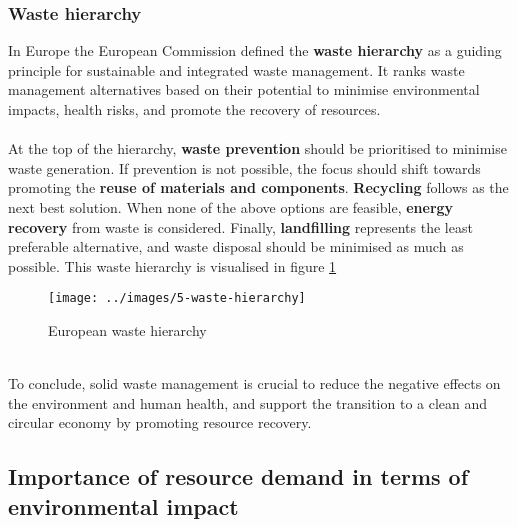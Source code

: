 \documentclass[../summary.tex]{subfiles}
\begin{document}
\subsubsection{Waste hierarchy}

In Europe the European Commission defined the \textbf{waste hierarchy} as a guiding principle for sustainable and integrated waste management. It ranks waste management alternatives based on their potential to minimise environmental impacts, health risks, and promote the recovery of resources.
\\\\
At the top of the hierarchy, \textbf{waste prevention} should be prioritised to minimise waste generation. If prevention is not possible, the focus should shift towards promoting the \textbf{reuse of materials and components}. \textbf{Recycling} follows as the next best solution. When none of the above options are feasible, \textbf{energy recovery} from waste is considered. Finally, \textbf{landfilling} represents the least preferable alternative, and waste disposal should be minimised as much as possible. This waste hierarchy is visualised in figure \ref{fig:waste-hierarchy}

\begin{figure}[H]
	\centering
	\texttt{[image: ../images/5-waste-hierarchy]}
	\caption{European waste hierarchy}
	\label{fig:waste-hierarchy}
\end{figure}

\ \\
To conclude, solid waste management is crucial to reduce the negative effects on the environment and human health, and support the transition to a clean and circular economy by promoting resource recovery.
\newpage

\subsection{Importance of resource demand in terms of environmental impact}
\end{document}
